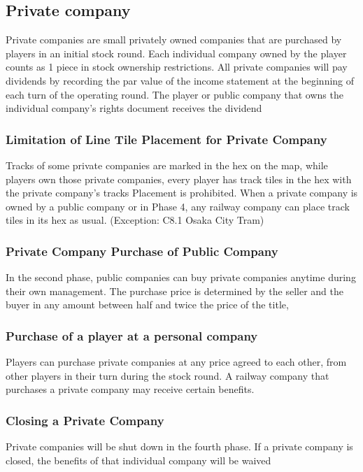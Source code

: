 \documentclass{article}
\begin{document}
\begin{CJK}{UTF8}{min}
\subsection{Private company}
Private companies are small privately owned companies that are
purchased by players in an initial stock round. Each individual
company owned by the player counts as 1 piece in stock ownership
restrictions. All private companies will pay dividends by recording
the par value of the income statement at the beginning of each turn of
the operating round. The player or public company that owns the
individual company's rights document receives the dividend

\subsubsection{Limitation of Line Tile Placement for Private Company}
Tracks of some private companies are marked in the hex on the map,
while players own those private companies, every player has track
tiles in the hex with the private company's tracks Placement is
prohibited. When a private company is owned by a public company or in
Phase 4, any railway company can place track tiles in its hex as
usual. (Exception: C8.1 Osaka City Tram)

\subsubsection{Private Company Purchase of Public Company}
In the second phase, public companies can buy private companies
anytime during their own management. The purchase price is determined
by the seller and the buyer in any amount between half and twice the
price of the title,

\subsubsection{Purchase of a player at a personal company}
Players can purchase private companies at any price agreed to each
other, from other players in their turn during the stock round. A
railway company that purchases a private company may receive certain
benefits.

\subsubsection{Closing a Private Company}
Private companies will be shut down in the fourth phase. If a private
company is closed, the benefits of that individual company will be
waived


\end{CJK}
\end{document}
